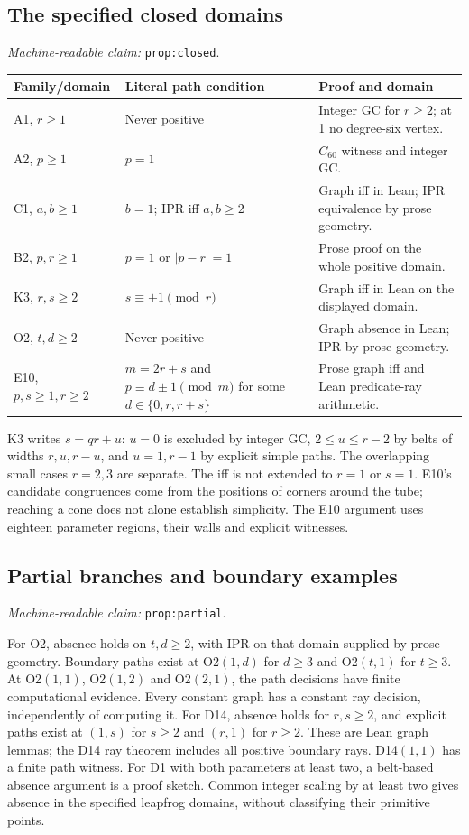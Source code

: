 \documentclass[11pt]{amsart}
\newcommand{\record}[1]{\nolinkurl{#1}}
\newcommand{\claimid}[1]{\par\nopagebreak\noindent\textit{Machine-readable claim:} \record{#1}.\par}
\theoremstyle{definition}\newtheorem{definition}{Definition}
\begin{document}
\subsection{The specified closed domains}\label{prop:closed}
\claimid{prop:closed}
\begin{center}\small
\begin{tabular}{p{}p{}p{}}\toprule
Family/domain & Literal path condition & Proof and domain\\\midrule
A1, $r\ge1$ & Never positive & Integer GC for $r\ge2$; at 1 no degree-six vertex.\\
A2, $p\ge1$ & $p=1$ & $C_{60}$ witness and integer GC.\\
C1, $a,b\ge1$ & $b=1$; IPR iff $a,b\ge2$ & Graph iff in Lean; IPR equivalence by prose geometry.\\
B2, $p,r\ge1$ & $p=1$ or $|p-r|=1$ & Prose proof on the whole positive domain.\\
K3, $r,s\ge2$ & $s\equiv\pm1\pmod r$ & Graph iff in Lean on the displayed domain.\\
O2, $t,d\ge2$ & Never positive & Graph absence in Lean; IPR by prose geometry.\\
E10, $p,s\ge1,r\ge2$ & $m=2r+s$ and $p\equiv d\pm1\pmod m$ for some $d\in\{0,r,r+s\}$ & Prose graph iff and Lean predicate-ray arithmetic.\\\bottomrule
\end{tabular}
\end{center}
K3 writes $s=qr+u$: $u=0$ is excluded by integer GC,
$2\le u\le r-2$ by belts of widths $r,u,r-u$, and $u=1,r-1$
by explicit simple paths. The overlapping small cases $r=2,3$ are
separate. The iff is not extended to $r=1$ or $s=1$. E10's candidate
congruences come from the positions of corners around the tube;
reaching a cone does not alone establish simplicity. The E10 argument uses eighteen parameter regions, their walls and
explicit witnesses.

\subsection{Partial branches and boundary examples}\label{prop:partial}
\claimid{prop:partial}
For O2, absence holds on $t,d\ge2$, with IPR on that domain supplied
by prose geometry. Boundary paths exist at O2$(1,d)$ for $d\ge3$ and
O2$(t,1)$ for $t\ge3$. At O2$(1,1)$, O2$(1,2)$ and O2$(2,1)$,
the path decisions have finite computational evidence. Every constant
graph has a constant ray decision, independently of computing it.
For D14, absence holds for $r,s\ge2$, and explicit paths exist at
$(1,s)$ for $s\ge2$ and $(r,1)$ for $r\ge2$. These are Lean graph
lemmas; the D14 ray theorem includes all positive boundary rays.
D14$(1,1)$ has a finite path witness. For D1 with both parameters at
least two, a belt-based absence argument is a proof sketch. Common
integer scaling by at least two gives absence in the specified
leapfrog domains, without classifying their primitive points.
\end{document}
